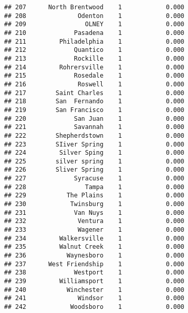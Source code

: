\documentclass[]{article}
\newenvironment{Shaded}{\begin{snugshade}}{\end{snugshade}}
\newcommand{\KeywordTok}[1]{\textcolor[rgb]{0.13,0.29,0.53}{\textbf{#1}}}
\newcommand{\DataTypeTok}[1]{\textcolor[rgb]{0.13,0.29,0.53}{#1}}
\newcommand{\DecValTok}[1]{\textcolor[rgb]{0.00,0.00,0.81}{#1}}
\newcommand{\StringTok}[1]{\textcolor[rgb]{0.31,0.60,0.02}{#1}}
\newcommand{\OperatorTok}[1]{\textcolor[rgb]{0.81,0.36,0.00}{\textbf{#1}}}
\newcommand{\NormalTok}[1]{#1}
\begin{document}
\begin{verbatim}
## 207      North Brentwood    1            0.000
## 208              Odenton    1            0.000
## 209                OLNEY    1            0.000
## 210             Pasadena    1            0.000
## 211         Philadelphia    1            0.000
## 212             Quantico    1            0.000
## 213             Rockille    1            0.000
## 214         Rohrersville    1            0.000
## 215             Rosedale    1            0.000
## 216              Roswell    1            0.000
## 217        Saint Charles    1            0.000
## 218        San  Fernando    1            0.000
## 219        San Francisco    1            0.000
## 220             San Juan    1            0.000
## 221             Savannah    1            0.000
## 222        Shepherdstown    1            0.000
## 223        SIiver Spring    1            0.000
## 224         Silver Sping    1            0.000
## 225        silver spring    1            0.000
## 226        Sliver Spring    1            0.000
## 227             Syracuse    1            0.000
## 228                Tampa    1            0.000
## 229           The Plains    1            0.000
## 230            Twinsburg    1            0.000
## 231             Van Nuys    1            0.000
## 232              Ventura    1            0.000
## 233              Wagener    1            0.000
## 234         Walkersville    1            0.000
## 235         Walnut Creek    1            0.000
## 236           Waynesboro    1            0.000
## 237      West Friendship    1            0.000
## 238             Westport    1            0.000
## 239         Williamsport    1            0.000
## 240           Winchester    1            0.000
## 241              Windsor    1            0.000
## 242            Woodsboro    1            0.000
\end{verbatim}

\begin{Shaded}
\end{Shaded}
\end{document}

